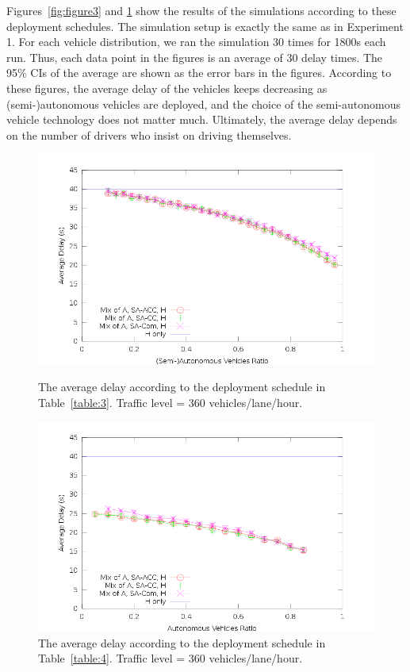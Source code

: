 Figures~\ref{fig:figure3} and \ref{fig:figure4} show the results of
the simulations according to these deployment schedules.  The
simulation setup is exactly the same as in Experiment 1.
For each vehicle distribution, we ran the simulation 30 times for 1800s each run.  Thus, each data point in the figures is
an average of 30 delay times.  The 95\% CIs of the average are shown
as the error bars in the figures.  According to these figures, the
average delay of the vehicles keeps decreasing as
(semi-)autonomous vehicles are deployed, and the choice of the
semi-autonomous vehicle technology does not matter much.  Ultimately, the
average delay depends on the number of drivers who insist on driving
themselves.

\begin{figure}[t]

\centering
\includegraphics[width=0.9\columnwidth]{figures/figure_3.png}
\caption{The average delay according to the 
deployment schedule in Table~\ref{table:3}.
Traffic level = 360 vehicles/lane/hour.}
\label{fig:figure3}

\mbox{}

\centering
\includegraphics[width=0.9\columnwidth]{figures/figure_4.png}
\caption{The average delay according to the 
deployment schedule in Table~\ref{table:4}.
Traffic level = 360 vehicles/lane/hour.}
\label{fig:figure4}
\end{figure}


